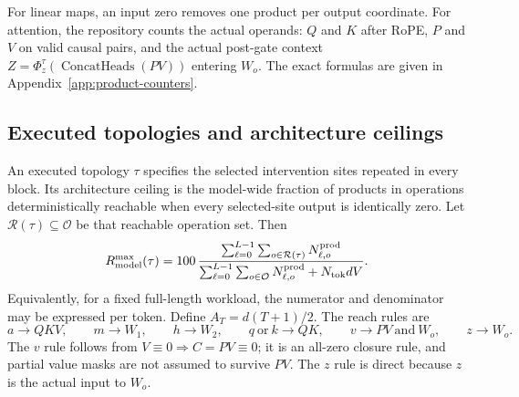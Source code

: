 For linear maps, an input zero removes one product per output coordinate. For
attention, the repository counts the actual operands: $Q$ and $K$ after RoPE,
$P$ and $V$ on valid causal pairs, and the actual post-gate context
$Z=\Phi_z^\tau(\operatorname{ConcatHeads}(PV))$ entering $W_o$. The exact
formulas are given in Appendix~\ref{app:product-counters}.

\subsection{Executed topologies and architecture ceilings}
\label{sec:topologies}

An executed topology $\tau$ specifies the selected intervention sites repeated
in every block. Its architecture ceiling is the model-wide fraction of products
in operations deterministically reachable when every selected-site output is
identically zero. Let $\mathcal R(\tau)\subseteq\mathcal O$ be that reachable
operation set. Then
\begin{equation}
    R_{\mathrm{model}}^{\max}(\tau)
      =100\,
       \frac{\sum_{\ell=0}^{L-1}\sum_{o\in\mathcal R(\tau)}
                    N^{\mathrm{prod}}_{\ell,o}}
            {\sum_{\ell=0}^{L-1}\sum_{o\in\mathcal O}
                    N^{\mathrm{prod}}_{\ell,o}
             +N_{\mathrm{tok}}dV}.
    \label{eq:r-model-max}
\end{equation}
Equivalently, for a fixed full-length workload, the numerator and denominator
may be expressed per token. Define $A_T=d(T+1)/2$. The reach rules are
\begin{equation}
    a\!\to\!QKV,\qquad
    m\!\to\!W_1,\qquad
    h\!\to\!W_2,\qquad
    q\ \text{or}\ k\!\to\!QK,\qquad
    v\!\to\!PV\ \text{and}\ W_o,\qquad
    z\!\to\!W_o.
    \label{eq:reach-rules}
\end{equation}
The $v$ rule follows from $V\equiv0\Rightarrow C=PV\equiv0$; it is an
all-zero closure rule, and partial value masks are not assumed to survive
$PV$. The $z$ rule is direct because $z$ is the actual input to $W_o$.

